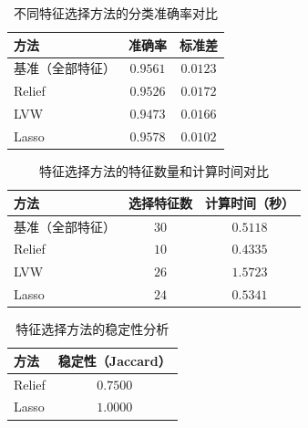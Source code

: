 \begin{table}[H]
\centering
\caption{不同特征选择方法的分类准确率对比}
\label{tab:accuracy}
\begin{tabular}{lcc}
\toprule
\textbf{方法} & \textbf{准确率} & \textbf{标准差} \\
\midrule
基准（全部特征） & $0.9561$ & $0.0123$ \\
Relief & $0.9526$ & $0.0172$ \\
LVW & $0.9473$ & $0.0166$ \\
Lasso & $0.9578$ & $0.0102$ \\
\bottomrule
\end{tabular}
\end{table}

\begin{table}[H]
\centering
\caption{特征选择方法的特征数量和计算时间对比}
\label{tab:time_features}
\begin{tabular}{lcc}
\toprule
\textbf{方法} & \textbf{选择特征数} & \textbf{计算时间（秒）} \\
\midrule
基准（全部特征） & $30$ & $0.5118$ \\
Relief & $10$ & $0.4335$ \\
LVW & $26$ & $1.5723$ \\
Lasso & $24$ & $0.5341$ \\
\bottomrule
\end{tabular}
\end{table}

\begin{table}[H]
\centering
\caption{特征选择方法的稳定性分析}
\label{tab:stability}
\begin{tabular}{lc}
\toprule
\textbf{方法} & \textbf{稳定性（Jaccard）} \\
\midrule
Relief & $0.7500$ \\
Lasso & $1.0000$ \\
\bottomrule
\end{tabular}
\end{table}